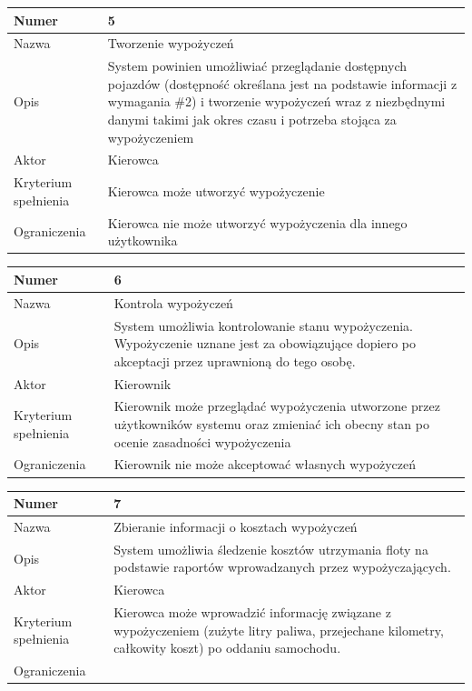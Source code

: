 \documentclass[eng,printmode,openany]{mgr}
\begin{document}
\begin{table}[H]
	\begin{tabularx}{\textwidth}{|l|X|}
		\hline
		Numer                & 5 \\ \hline
		Nazwa                & Tworzenie wypożyczeń \\ \hline
		Opis                 & System powinien umożliwiać przeglądanie dostępnych pojazdów (dostępność określana jest na podstawie informacji z wymagania \#2) i tworzenie wypożyczeń wraz z niezbędnymi danymi takimi jak okres czasu i potrzeba stojąca za wypożyczeniem\\ \hline
		Aktor                & Kierowca \\ \hline
		Kryterium spełnienia & Kierowca może utworzyć wypożyczenie \\ \hline
		Ograniczenia         & Kierowca nie może utworzyć wypożyczenia dla innego użytkownika \\ \hline
	\end{tabularx}
\end{table}

\begin{table}[H]
	\begin{tabularx}{\textwidth}{|l|X|}
		\hline
		Numer                & 6 \\ \hline
		Nazwa                & Kontrola wypożyczeń\\ \hline
		Opis                 & System umożliwia kontrolowanie stanu wypożyczenia. Wypożyczenie uznane jest za obowiązujące dopiero po akceptacji przez uprawnioną do tego osobę.\\ \hline
		Aktor                & Kierownik \\ \hline
		Kryterium spełnienia & Kierownik może przeglądać wypożyczenia utworzone przez użytkowników systemu oraz zmieniać ich obecny stan po ocenie zasadności wypożyczenia \\ \hline
		Ograniczenia         & Kierownik nie może akceptować własnych wypożyczeń \\ \hline
	\end{tabularx}
\end{table}

\begin{table}[H]
	\begin{tabularx}{\textwidth}{|l|X|}
		\hline
		Numer                & 7 \\ \hline
		Nazwa                & Zbieranie informacji o kosztach wypożyczeń\\ \hline
		Opis                 & System umożliwia śledzenie kosztów utrzymania floty na podstawie raportów wprowadzanych przez wypożyczających. \\ \hline
		Aktor                & Kierowca\\ \hline
		Kryterium spełnienia & Kierowca może wprowadzić informację związane z wypożyczeniem (zużyte litry paliwa, przejechane kilometry, całkowity koszt) po oddaniu samochodu.\\ \hline
		Ograniczenia         & \\ \hline
	\end{tabularx}
\end{table}
\end{document}
